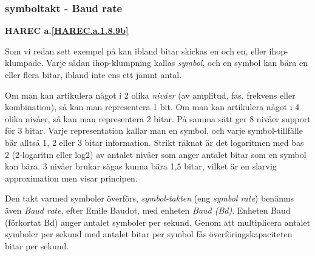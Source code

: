 \subsubsection{symboltakt - Baud rate}
\textbf{HAREC a.\ref{HAREC.a.1.8.9b}\label{myHAREC.a.1.8.9b}}
\begin{rev-nytt}[MAD]

Som vi redan sett exempel på kan ibland bitar skickas en och en, eller
ihop-klumpade. Varje sådan ihop-klumpning kallas \emph{symbol}, och en symbol
kan bära en eller flera bitar, ibland inte ens ett jämnt antal.

Om man kan artikulera något i 2 olika \emph{nivåer} (av amplitud, fas, frekvens
eller kombination), så kan man representera 1 bit. Om man kan artikulera något
i 4 olika nivåer, så kan man representera 2 bitar. På samma sätt ger 8 nivåer
support för 3 bitar. Varje representation kallar man en symbol, och varje
symbol-tillfälle bär alltså 1, 2 eller 3 bitar information. Strikt räknat
är det logaritmen med bas 2 (2-logaritm eller log2) av antalet nivåer som
anger antalet bitar som en symbol kan bära. 3 nivåer brukar sägas kunna bära
1,5 bitar, vilket är en slarvig approximation men visar principen.

Den takt varmed symboler överförs, \emph{symbol-takten} (eng \emph{symbol rate})
benämns även \emph{Baud rate}, efter Emile Baudot, med enheten \emph{Baud (Bd)}.
Enheten Baud (förkortat Bd) anger antalet symboler per sekund. Genom att
multiplicera antalet symboler per sekund med antalet bitar per symbol fås
överföringskapaciteten bitar per sekund.

\end{rev-nytt}

